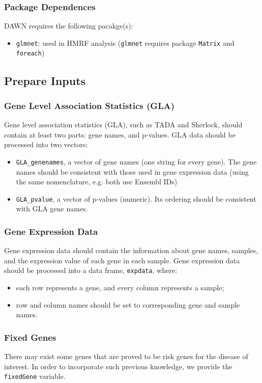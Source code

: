 \documentclass{article}
\begin{document}
		\subsubsection{Package Dependences}
		DAWN requires the following pacakge(s):
		\begin{itemize}
			\item \texttt{glmnet}\cite{glmnet1, glmnet2}: used in HMRF analysis (\texttt{glmnet} requires package \texttt{Matrix} and \texttt{foreach})
		\end{itemize}
	
	\subsection{Prepare Inputs}
		\subsubsection{Gene Level Association Statistics (GLA)}
		\label{inputGLA}
		Gene level association statistics (GLA), such as TADA and Sherlock, should contain at least two parts: gene names, and p-values. GLA data should be processed into two vectors:
		\begin{itemize}
			\item \texttt{GLA\_genenames}, a vector of gene names (one string for every gene). The gene names should be consistent with those used in gene expression data (using the same nomenclature, e.g. both use Ensembl IDs)
			\item\texttt{GLA\_pvalue}, a vector of p-values (numeric). Its ordering should be consistent with GLA gene names.
		\end{itemize}
		
		\subsubsection{Gene Expression Data}
		\label{inputExpression}
		Gene expression data should contain the information about gene names, samples, and the expression value of each gene in each sample. Gene expression data should be processed into a data frame, \texttt{expdata}, where:
		\begin{itemize}
			\item each row represents a gene, and every column represents a sample;
			\item row and column names should be set to corresponding gene and sample names. 
		\end{itemize}
		
		\subsubsection{Fixed Genes}
		\label{inputFixedGenes}
		There may exist some genes that are proved to be risk genes for the disease of interest. In order to incorporate such previous knowledge, we provide the \texttt{fixedGene} variable. 
		
\end{document}
